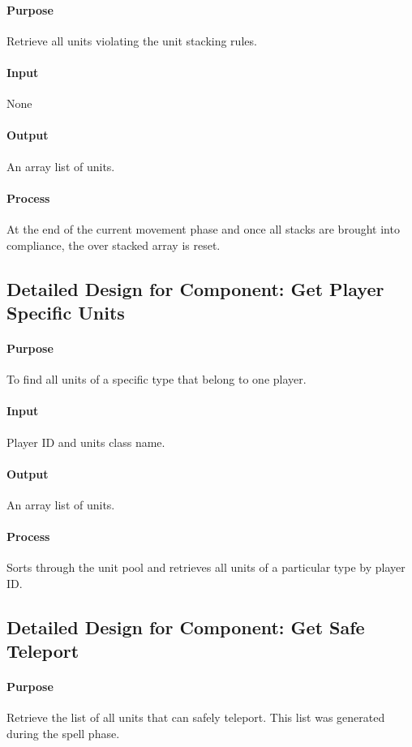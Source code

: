 \documentclass[12pt,a4paper,titlepage]{article}
\begin{document}
\paragraph{Purpose} Retrieve all units violating the unit stacking rules.
\paragraph{Input} None
\paragraph{Output} An array list of units.
\paragraph{Process} At the end of the current movement phase and once all stacks are brought into compliance, the over stacked array is reset.

\subsection{Detailed Design for Component: Get Player Specific Units}
\paragraph{Purpose} To find all units of a specific type that belong to one player.
\paragraph{Input} Player ID and units class name.
\paragraph{Output} An array list of units.
\paragraph{Process} Sorts through the unit pool and retrieves all units of a particular type by player ID.

\subsection{Detailed Design for Component: Get Safe Teleport}
\paragraph{Purpose} Retrieve the list of all units that can safely teleport. This list was generated during the spell phase.
\end{document}
